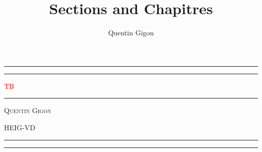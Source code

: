\documentclass[french]{article}
\title{Sections and Chapitres}
\author{Quentin Gigon}
\date{ }
\begin{document}
\begin{titlepage} %
	
	\centering %
	
	
	\rule{\textwidth}{1pt} %
	
	\vspace{2pt}\vspace{-\baselineskip} %
	
	\rule{\textwidth}{0.4pt} %
	
	\vspace{0.1\textheight} %
	
	
	\textcolor{Red}{ %
		{\Huge TB}\\[0.5\baselineskip] %
	}
	
	\vspace{0.025\textheight} %
	
	\rule{0.3\textwidth}{0.4pt} %
	
	\vspace{0.1\textheight} %
	
	
	{\Large \textsc{Quentin Gigon}} %
	
	\vfill %
	
	
	{\large\textsc{HEIG-VD}} %
	
	\vspace{0.1\textheight} %
	
	
	\rule{\textwidth}{0.4pt} %
	
	\vspace{2pt}\vspace{-\baselineskip} %
	
	\rule{\textwidth}{1pt} %
	
\end{titlepage}
\end{document}
